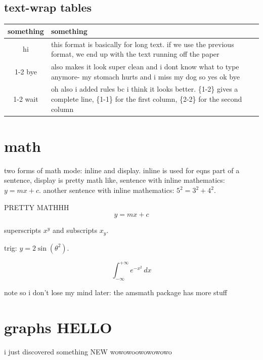 \documentclass{article}
\begin{document}
\subsection{text-wrap tables}

\begin{tabular}{cp{9cm}}
    \toprule
    something & something \\
    \midrule
    hi & this format is basically for long text. if we use the previous format, we end up with the text running off the paper\\
    \cmidrule{1-2}
    bye & also makes it look super clean and i dont know what to type anymore- my stomach hurts and i miss my dog so yes ok bye\\
    \cmidrule{1-2}
    wait & oh also i added rules bc i think it looks better. \{1-2\} gives a complete line, \{1-1\} for the first column, \{2-2\} for the second column\\
    \bottomrule
\end{tabular}

\section{math}

two forms of math mode: inline and display. inline is used for eqns part of a sentence, display is pretty math
like, sentence with inline mathematics: $y = mx + c$.
another sentence with inline mathematics: $5^{2}=3^{2}+4^{2}$.
\bigskip

PRETTY MATHHH
\[
  y = mx + c
\]

superscripts $x^{y}$ and subscripts $x_{y}$.
\medskip

trig: $y = 2 \sin(\theta^{2})$.
\medskip

\begin{equation}
    \int_{-\infty}^{+\infty} e^{-x^2} \, dx
\end{equation}

note so i don't lose my mind later: the amsmath package has more stuff

\section{graphs HELLO}

i just discovered something NEW wowowoowowowowo
\end{document}
